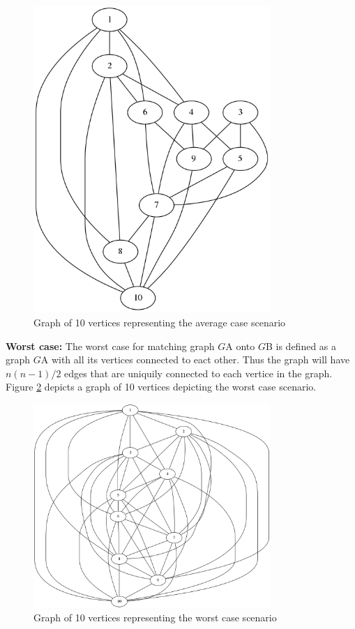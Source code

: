\begin{figure}[H]
  \begin{center}
      \includegraphics[width=0.8\textwidth]{average.png}
  \end{center}    
  \caption{Graph of 10 vertices representing the average case scenario}
  \label{fig:average_case}
\end{figure}

\textbf{Worst case:} The worst case for matching graph $G${\tiny A} onto $G${\tiny B} is defined as a graph $G${\tiny A} with all its vertices connected
to eact other. Thus the graph will have $n(n − 1)/2$ edges that are uniquily connected to each vertice in the graph. Figure \ref{fig:worst_case} depicts
a graph of 10 vertices depicting the worst case scenario.

\begin{figure}[H]
  \begin{center}
      \includegraphics[width=0.8\textwidth]{worst.png}
  \end{center}    
  \caption{Graph of 10 vertices representing the worst case scenario}
  \label{fig:worst_case}
\end{figure}
\newpage
